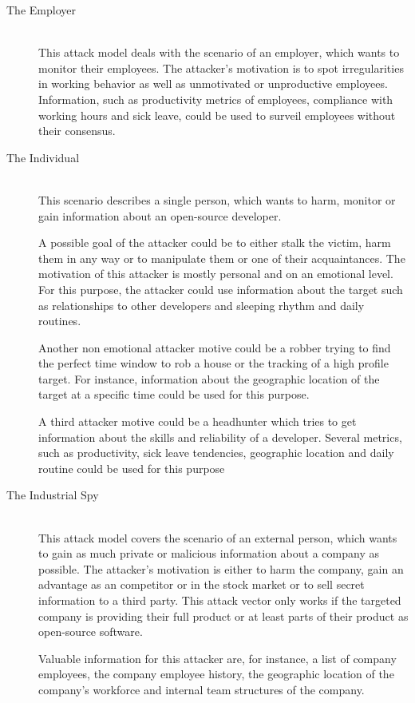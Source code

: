 \begin{description}
    \item[The Employer] \hfill \\
        This attack model deals with the scenario of an employer, which wants to monitor their employees.
        The attacker's motivation is to spot irregularities in working behavior as well as unmotivated or unproductive employees.
        Information, such as productivity metrics of employees, compliance with working hours and sick leave, could be used to surveil employees without their consensus.

    \item[The Individual] \hfill \\
        This scenario describes a single person, which wants to harm, monitor or gain information about an open-source developer.

        A possible goal of the attacker could be to either stalk the victim, harm them in any way or to manipulate them or one of their acquaintances.
        The motivation of this attacker is mostly personal and on an emotional level.
        For this purpose, the attacker could use information about the target such as relationships to other developers and sleeping rhythm and daily routines.

        Another non emotional attacker motive could be a robber trying to find the perfect time window to rob a house or the tracking of a high profile target.
        For instance, information about the geographic location of the target at a specific time could be used for this purpose.

        A third attacker motive could be a headhunter which tries to get information about the skills and reliability of a developer.
        Several metrics, such as productivity, sick leave tendencies, geographic location and daily routine could be used for this purpose

    \item[The Industrial Spy] \hfill \\
        This attack model covers the scenario of an external person, which wants to gain as much private or malicious information about a company as possible.
        The attacker's motivation is either to harm the company, gain an advantage as an competitor or in the stock market or to sell secret information to a third party.
        This attack vector only works if the targeted company is providing their full product or at least parts of their product as open-source software.

        Valuable information for this attacker are, for instance, a list of company employees, the company employee history, the geographic location of the company's workforce and internal team structures of the company.
\end{description}


